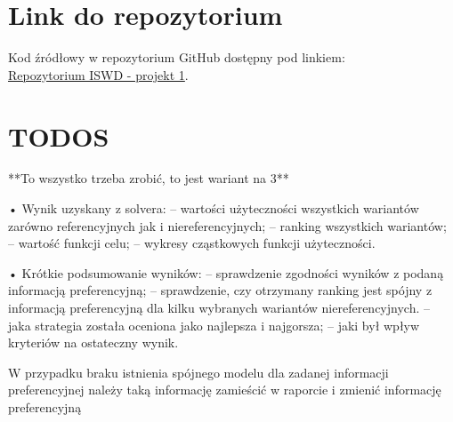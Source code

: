 \documentclass[11pt]{article}
\begin{document}
\section{Link do repozytorium}\label{sec:link-do-repo}
Kod źródłowy w repozytorium GitHub dostępny pod linkiem: \\
\href{https://github.com/KotZPolibudy/PUT_ISWD/tree/main/projekt1}{Repozytorium ISWD - projekt 1}.


\section{TODOS}\label{sec:todos}

**To wszystko trzeba zrobić, to jest wariant na 3**

• Wynik uzyskany z solvera:
– wartości użyteczności wszystkich wariantów zarówno referencyjnych jak i niereferencyjnych;
– ranking wszystkich wariantów;
– wartość funkcji celu;
– wykresy cząstkowych funkcji użyteczności.

• Krótkie podsumowanie wyników:
– sprawdzenie zgodności wyników z podaną informacją preferencyjną;
– sprawdzenie, czy otrzymany ranking jest spójny z informacją preferencyjną dla kilku wybranych wariantów niereferencyjnych.
– jaka strategia została oceniona jako najlepsza i najgorsza;
– jaki był wpływ kryteriów na ostateczny wynik.

W przypadku braku istnienia spójnego modelu dla zadanej informacji preferencyjnej należy taką
informację zamieścić w raporcie i zmienić informację preferencyjną
\end{document}
